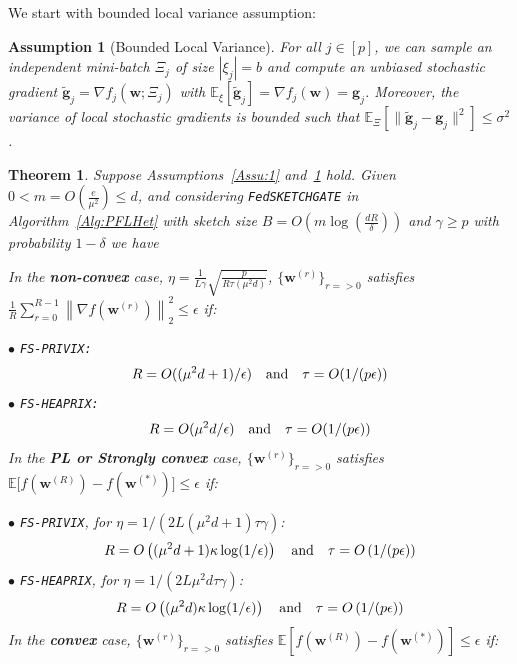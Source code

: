 \documentclass[twoside]{article}
\newtheorem{theorem}{Theorem}
\newtheorem{assumption}{Assumption}
\begin{document}
We start with bounded local variance assumption:
\begin{assumption}[Bounded Local Variance]\label{Assu:2}
For all $j\in [p]$, we can sample an independent mini-batch $\Xi_j$ of size $|{\xi}_j| = b$ and compute an unbiased stochastic gradient $\tilde{\mathbf{g}}_j = \nabla f_j(\boldsymbol{w}; \Xi_j)$ with $\mathbb{E}_{\xi}[\tilde{\mathbf{g}}_j] = \nabla f_{j}(\boldsymbol{w})={\mathbf{g}}_j$. 
Moreover, the variance of local stochastic gradients is bounded such that $
\mathbb{E}_{\Xi}\left[\|\tilde{\mathbf{g}}_j-{\mathbf{g}}_j\|^2\right]\leq \sigma^2$.
\end{assumption}
\begin{theorem}\label{thm:hetreg_case}
Suppose Assumptions~\ref{Assu:1} and~\ref{Assu:2} hold. Given $0<m=O\left(\frac{e}{\mu^2}\right)\leq d$, and considering \texttt{FedSKETCHGATE} in Algorithm~\ref{Alg:PFLHet} with sketch size $B=O\left(m\log\left(\frac{d R}{\delta}\right)\right)$ and $\gamma\geq p$ with probability $1-\delta$ we have  



In the \textbf{non-convex} case, $\eta=\frac{1}{L\gamma}\sqrt{\frac{p}{R\tau\left(\mu^2d\right)}}$, $\{ {\boldsymbol{w}}^{(r)}\}_{r=>0}$ satisfies  $\frac{1}{R}\sum_{r=0}^{R-1}\left\|\nabla f({\boldsymbol{w}}^{(r)})\right\|_2^2\leq {\epsilon}$ if: 
 
\noindent $\bullet$ \texttt{FS-PRIVIX:}    
\begin{equation}\notag
R=O((\mu^2d+1)/\epsilon) \quad \textrm{and} \quad \tau=O(1/(p\epsilon))
 \end{equation}
\noindent $\bullet$ \texttt{FS-HEAPRIX:} 
\begin{equation}\notag
R=O(\mu^2d/\epsilon) \quad \textrm{and} \quad \tau=O(1/(p\epsilon))
 \end{equation}
In the \textbf{PL or Strongly convex} case, $\{ {\boldsymbol{w}}^{(r)}\}_{r=>0}$ satisfies $\mathbb{E}\Big[f({\boldsymbol{w}}^{(R)})-f({\boldsymbol{w}}^{(*)})\Big]\leq \epsilon$ if: 

\noindent $\bullet$ \texttt{FS-PRIVIX}, for $\eta=1/(2L(\mu^2d+1)\tau\gamma)$:    
\begin{equation}\notag
R=O\left((\mu^2d+1)\kappa \log(1/\epsilon)\right) \quad \textrm{and} \quad \tau=O\left(1/(p\epsilon)\right)
 \end{equation}
\noindent $\bullet$ \texttt{FS-HEAPRIX}, for $\eta=1/(2L\mu^2d\tau\gamma)$:
\begin{equation}\notag
R=O\left((\mu^2d)\kappa \log(1/\epsilon)\right) \quad \textrm{and} \quad \tau=O\left(1/(p\epsilon)\right)
 \end{equation}
 In the \textbf{convex} case, $\{ {\boldsymbol{w}}^{(r)}\}_{r=>0}$ satisfies $ \mathbb{E}[f({\boldsymbol{w}}^{(R)})-f({\boldsymbol{w}}^{(*)})]\leq \epsilon$ if: 
 

\end{theorem}
\end{document}

